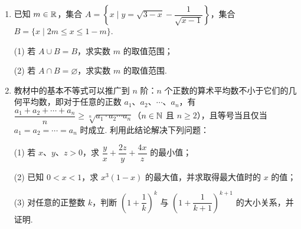 \begin{enumerate}
\item 已知 $m\in\mathbb{R}$，集合 $A=\left\{x\mid y=\sqrt{3-x}-\dfrac{1}{\sqrt{x-1}}\right\}$，集合 $B=\{x\mid 2m\leqslant x\leqslant1-m\}$.

(1) 若 $A\cup B=B$，求实数 $m$ 的取值范围；

(2) 若 $A\cap B=\varnothing$，求实数 $m$ 的取值范围.

\ifanswer
\solbegin
{}
\step{综上，实数 $m$ 的取值范围为 $(-\infty,-2]$；}
\step{综上，实数 $m$ 的取值范围为 $[0,+\infty)$.}
\solend
\fi

\item 教材中的基本不等式可以推广到 $n$ 阶：$n$ 个正数的算术平均数不小于它们的几何平均数，即对于任意的正数 $a_1$、$a_2$、$\cdots$、$a_n$，有 $\dfrac{a_1+a_2+\cdots+a_n}{n}\geqslant\sqrt[n]{a_1\cdot a_2\cdots a_n}$（$n\in\mathbb{N}$ 且 $n\geqslant2$），且等号当且仅当 $a_1=a_2=\cdots=a_n$ 时成立. 利用此结论解决下列问题：

(1) 若 $x$、$y$、$z>0$，求 $\dfrac{y}{x}+\dfrac{2z}{y}+\dfrac{4x}{z}$ 的最小值；

(2) 已知 $0<x<1$，求 $x^3(1-x)$ 的最大值，并求取得最大值时的 $x$ 的值；

(3) 对任意的正整数 $k$，判断 $\left(1+\dfrac{1}{k}\right)^k$ 与 $\left(1+\dfrac{1}{k+1}\right)^{k+1}$ 的大小关系，并证明.


\end{enumerate}
